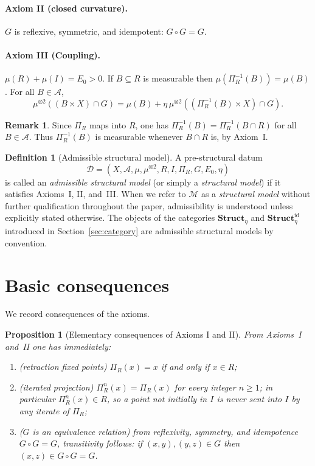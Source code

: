 \documentclass[11pt]{article}
\numberwithin{equation}{section}
\newtheorem{proposition}[theorem]{Proposition}
\theoremstyle{definition}
\newtheorem{definition}[theorem]{Definition}
\newtheorem{remark}[theorem]{Remark}
\begin{document}
\paragraph{Axiom II (closed curvature).}
$G$ is reflexive, symmetric, and idempotent: $G\circ G=G$.

\paragraph{Axiom III (Coupling).}
$\mu(R)+\mu(I)=E_0>0$.
If $B\subseteq R$ is measurable then $\mu(\Pi_R^{-1}(B))=\mu(B)$.
For all $B\in\mathcal A$,
\[
\mu^{\otimes2}((B\times X)\cap G)
= \mu(B)+\eta\,\mu^{\otimes2}((\Pi_R^{-1}(B)\times X)\cap G).
\]

\begin{remark}\label{rem:preimage}
Since $\Pi_R$ maps into $R$, one has $\Pi_R^{-1}(B)=\Pi_R^{-1}(B\cap R)$ for all $B\in\mathcal A$.
Thus $\Pi_R^{-1}(B)$ is measurable whenever $B\cap R$ is, by Axiom~I.
\end{remark}

\begin{definition}[Admissible structural model]\label{def:admissible}
A pre-structural datum
\[
\mathcal D=(X,\mathcal A,\mu,\mu^{\otimes2},R,I,\Pi_R,G,E_0,\eta)
\]
is called an \emph{admissible structural model} (or simply a \emph{structural model}) if it satisfies Axioms~I, II, and~III. When we refer to $\mathcal M$ as a \emph{structural model} without further qualification throughout the paper, admissibility is understood unless explicitly stated otherwise. The objects of the categories $\mathbf{Struct}_\eta$ and $\mathbf{Struct}^{\mathrm{id}}_\eta$ introduced in Section~\ref{sec:category} are admissible structural models by convention.
\end{definition}

\section{Basic consequences}

We record consequences of the axioms.

\begin{proposition}[Elementary consequences of Axioms I and II]\label{prop:elementary}
From Axioms~I and~II one has immediately:
\begin{enumerate}[label=(\roman*),nosep]
\item (\emph{retraction fixed points}) $\Pi_R(x)=x$ if and only if $x\in R$;
\item (\emph{iterated projection}) $\Pi_R^n(x)=\Pi_R(x)$ for every integer $n\ge 1$; in particular $\Pi_R^n(x)\in R$, so a point not initially in $I$ is never sent into $I$ by any iterate of $\Pi_R$;
\item (\emph{$G$ is an equivalence relation}) from reflexivity, symmetry, and idempotence $G\circ G=G$, transitivity follows: if $(x,y),(y,z)\in G$ then $(x,z)\in G\circ G=G$.
\end{enumerate}
\end{proposition}
\end{document}

